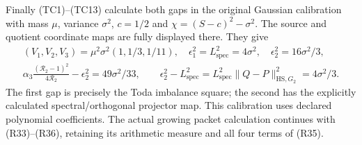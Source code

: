 Finally (TC1)--(TC13) calculate both gaps in the original Gaussian
calibration with mass $\mu$, variance $\sigma^2$, $c=1/2$ and
$\chi=(S-c)^2-\sigma^2$. The source and quotient coordinate maps are
fully displayed there. They give
\[
\begin{gathered}
 (V_1,V_2,V_3)=\mu^2\sigma^2(1,1/3,1/11),\quad
 \epsilon_1^2=L_{\mathrm{spec}}^2=4\sigma^2,\quad
 \epsilon_2^2=16\sigma^2/3,\\
 \alpha_3\frac{(\mathcal R_2-1)^2}{4\mathcal R_2}-\epsilon_2^2
 =49\sigma^2/33,\qquad
 \epsilon_2^2-L_{\mathrm{spec}}^2
 =L_{\mathrm{spec}}^2\|Q-P\|_{\mathrm{HS},G_2}^2=4\sigma^2/3.
\end{gathered}
\tag{R37}
\]
The first gap is precisely the Toda imbalance square; the second has
the explicitly calculated spectral/orthogonal projector map. This
calibration uses declared polynomial coefficients. The actual growing
packet calculation continues with (R33)--(R36), retaining its arithmetic
measure and all four terms of (R35).
